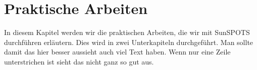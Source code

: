 \chapter{Praktische Arbeiten}\label{c:PraktischeArbeiten}

In diesem Kapitel werden wir die praktischen Arbeiten, die wir mit SunSPOTS durchführen erläutern. Dies wird in zwei Unterkapiteln durchgeführt. Man sollte damit das hier besser aussieht auch viel Text haben. Wenn nur eine Zeile unterstrichen ist sieht das nicht ganz so gut aus.



